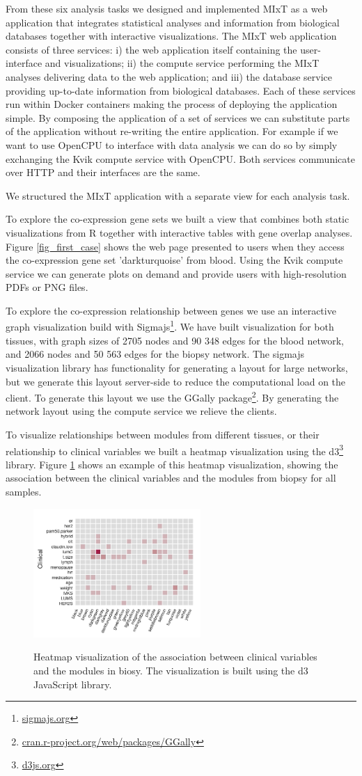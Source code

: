 From these six analysis tasks we designed and implemented MIxT as a web
application that integrates statistical analyses and information from biological
databases together with interactive visualizations.
The MIxT web application
consists of three services: i) the web application itself containing the
user-interface and visualizations; ii) the compute service performing the MIxT
analyses delivering data to the web application; and iii) the database service
providing up-to-date information from biological databases. Each of these
services run within Docker containers making the process of deploying the
application simple. 
By composing the
application of a set of services we can substitute parts of the application
without re-writing the entire application.
For example if we want to use OpenCPU to interface with data analysis we can do
so by simply exchanging the Kvik compute service with OpenCPU. Both services
communicate over HTTP and their interfaces are the same. 

We structured the MIxT application with a separate view for each analysis task.

To explore the co-expression gene sets we built a view that combines both static
visualizations from R together with interactive tables with gene overlap
analyses. Figure \ref{fig_first_case} shows the web page presented to users when
they access the co-expression gene set 'darkturquoise' from blood. Using the
Kvik compute service we can generate plots on demand and provide users with
high-resolution PDFs or PNG files. 

To explore the co-expression relationship between genes we use an interactive
graph visualization build with Sigmajs\footnote{\url{sigmajs.org}}. We have
built visualization for both tissues, with graph sizes of 2705 nodes and 90 348
edges for the blood network, and 2066 nodes and 50 563 edges for the biopsy
network. The sigmajs visualization library has functionality for generating a
layout for large networks, but we generate this layout server-side to reduce the
computational load on the client. To generate this layout we use the GGally
package\footnote{\url{cran.r-project.org/web/packages/GGally}}. By generating
the network layout using the compute service we relieve the clients.

To visualize relationships between modules from different tissues, or their
relationship to clinical variables we built a heatmap visualization using the 
d3\footnote{\url{d3js.org}} library. Figure \ref{fig_second_case} shows an
example of this heatmap visualization, showing the association between the
clinical variables and the modules from biopsy for all samples.  

\begin{figure}[h!]
\centering
\caption{Heatmap visualization of the association between clinical variables and
the modules in biosy. The visualization is built using the d3 JavaScript
library.} 
\includegraphics[width=2.5in]{figures/clinical-comp.png}
\label{fig_second_case}
\end{figure} 
